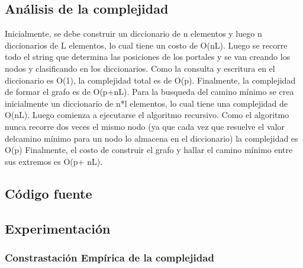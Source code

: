 \subsection{Análisis de la complejidad}
Inicialmente, se debe construir un diccionario de n elementos y luego n diccionarios de L elementos, lo cual tiene un costo de O(nL). Luego se recorre todo el string que determina las posiciones de los portales y se van creando los nodos y clasificando en los diccionarios. Como la consulta y escritura en el diccionario es O(1), la complejidad total es de O(p). Finalmente, la complejidad de formar el grafo es de O(p+nL).
Para la busqueda del camino mínimo se crea inicialmente un diccionario de n*l elementos, lo cual tiene una complejidad de O(nL). Luego comienza a ejecutarse el algoritmo recursivo. Como el algoritmo nunca recorre dos veces el mismo nodo (ya que cada vez que resuelve el valor delcamino mínimo para un nodo lo almacena en el diccionario) la complejidad es O(p)
Finalmente, el costo de construir el grafo y hallar el camino mínimo entre sus extremos es O(p+ nL).

\subsection{Código fuente}

\subsection{Experimentación}

\subsubsection{Constrastación Empírica de la complejidad}